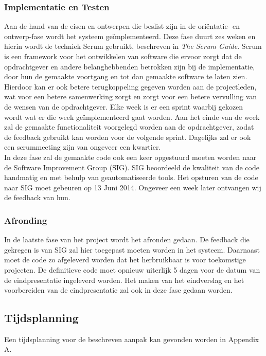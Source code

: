 \subsubsection{Implementatie en Testen}
Aan de hand van de eisen en ontwerpen die beslist zijn in de ori\"entatie- en ontwerp-fase wordt het systeem ge\"implementeerd. Deze fase duurt zes weken en hierin wordt de techniek Scrum gebruikt, beschreven in \emph{The Scrum Guide}. Scrum is een framework voor het ontwikkelen van software die ervoor zorgt dat de opdrachtgever en andere belanghebbenden betrokken zijn bij de implementatie, door hun de gemaakte voortgang en tot dan gemaakte software te laten zien. Hierdoor kan er ook betere terugkoppeling gegeven worden aan de projectleden, wat voor een betere samenwerking zorgt en zorgt voor een betere vervulling van de wensen van de opdrachtgever. Elke week is er een sprint waarbij gekozen wordt wat er die week ge\"implementeerd gaat worden. Aan het einde van de week zal de gemaakte functionaliteit voorgelegd worden aan de opdrachtgever, zodat de feedback gebruikt kan worden voor de volgende sprint. Dagelijks zal er ook een scrummeeting zijn van ongeveer een kwartier.\\
In deze fase zal de gemaakte code ook een keer opgestuurd moeten worden naar de Software Improvement Group (SIG). SIG beoordeeld de kwaliteit van de code handmatig en met behulp van geautomatiseerde tools. Het opsturen van de code naar SIG moet gebeuren op 13 Juni 2014. Ongeveer een week later ontvangen wij de feedback van hun.\\

\subsubsection{Afronding}
In de laatste fase van het project wordt het afronden gedaan. De feedback die gekregen is van SIG zal hier toegepast moeten worden in het systeem. Daarnaast moet de code zo afgeleverd worden dat het herbruikbaar is voor toekomstige projecten. De definitieve code moet opnieuw uiterlijk 5 dagen voor de datum van de eindpresentatie ingeleverd worden. Het maken van het eindverslag en het voorbereiden van de eindpresentatie zal ook in deze fase gedaan worden.\\

\subsection{Tijdsplanning}
Een tijdsplanning voor de beschreven aanpak kan gevonden worden in Appendix A.\\